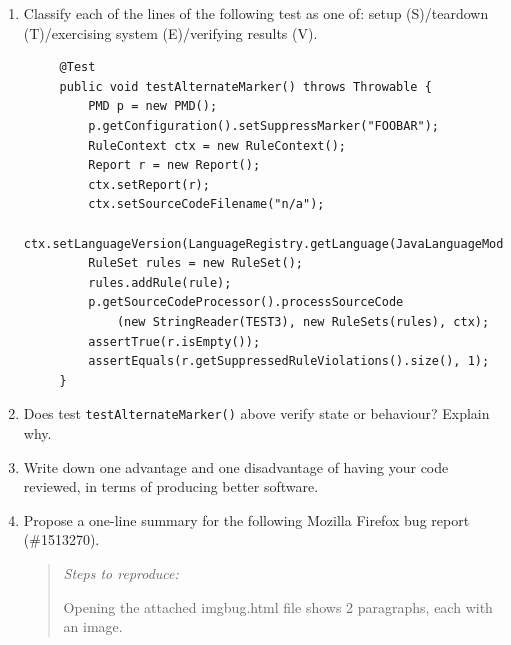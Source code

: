 \documentclass[12pt]{article}
\begin{document}
\begin{enumerate}[label=(\alph*)]
\item Classify each of the lines of the following test as one of: setup
(S)/teardown (T)/exercising system (E)/verifying results
(V).

\begin{lstlisting}
     @Test
     public void testAlternateMarker() throws Throwable {
         PMD p = new PMD();
         p.getConfiguration().setSuppressMarker("FOOBAR");
         RuleContext ctx = new RuleContext();
         Report r = new Report();
         ctx.setReport(r);
         ctx.setSourceCodeFilename("n/a");
         ctx.setLanguageVersion(LanguageRegistry.getLanguage(JavaLanguageModule.NAME).getDefaultVersion());
         RuleSet rules = new RuleSet();
         rules.addRule(rule);
         p.getSourceCodeProcessor().processSourceCode
             (new StringReader(TEST3), new RuleSets(rules), ctx);
         assertTrue(r.isEmpty());
         assertEquals(r.getSuppressedRuleViolations().size(), 1);
     }
\end{lstlisting}

\item Does test {\tt testAlternateMarker()} above verify state or behaviour? Explain why.
\vspace*{8em}
  
\item Write down one advantage and one disadvantage of having your code reviewed, in terms of producing better software.

\newpage
\item Propose a one-line summary for the following Mozilla Firefox bug report (\#1513270).

\begin{quote}
\emph{Steps to reproduce:}

Opening the attached imgbug.html file shows 2 paragraphs, each with an image.


\end{quote}
\end{enumerate}
\end{document}

